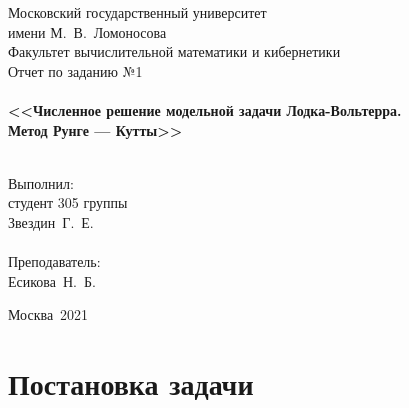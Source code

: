 \documentclass[a4paper,12pt,titlepage,finall]{article}
\begin{document}
\begin{titlepage}
    \begin{center}
	{\small \sc Московский государственный университет \\имени М.~В.~Ломоносова\\
	Факультет вычислительной математики и кибернетики\\}
	\vfill
	{\Large \sc Отчет по заданию №1}\\
	~\\
	{\large \bf <<Численное решение модельной задачи Лодка-Вольтерра.\\
	    Метод Рунге — Кутты>>}\\ 
	~\\
    \end{center}
    \begin{flushright}
	\vfill {Выполнил:\\
	студент 305 группы\\
	Звездин~Г.~Е.\\
	~\\
	Преподаватель:\\
	Есикова~Н.~Б.}
    \end{flushright}
    \begin{center}
	\vfill
	{\small Москва\ 2021}
    \end{center}
\end{titlepage}

\tableofcontents
\newpage

\section{Постановка задачи}
\end{document}
